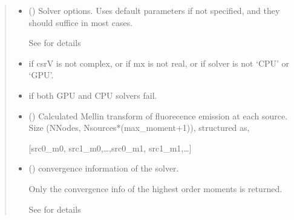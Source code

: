 \documentclass[letterpaper,10pt,english]{sphinxmanual}
\begin{document}
\begin{fulllineitems}
\begin{quote}
\begin{description}
\begin{itemize}
\item {} 
\sphinxAtStartPar
{} ({\hyperref[\detokenize{_autosummary/nirfasterff.utils.SolverOptions:nirfasterff.utils.SolverOptions}]{}}\sphinxstyleliteralemphasis{\sphinxupquote{, }}) \textendash{} 
\sphinxAtStartPar
Solver options. Uses default parameters if not specified, and they should suffice in most cases.

\sphinxAtStartPar
See {\hyperref[\detokenize{_autosummary/nirfasterff.utils.SolverOptions:nirfasterff.utils.SolverOptions}]{}} for details


\end{itemize}

\begin{itemize}
\item {} 
\sphinxAtStartPar
{} \textendash{} if csrV is not complex, or if mx is not real, or if solver is not ‘CPU’ or ‘GPU’.

\item {} 
\sphinxAtStartPar
{} \textendash{} if both GPU and CPU solvers fail.

\end{itemize}

\sphinxAtStartPar
\begin{itemize}
\item {} 
\sphinxAtStartPar
{} () \textendash{} Calculated Mellin transform of fluorecence emission at each source. Size (NNodes, Nsources*(max\_moment+1)), structured as,

\sphinxAtStartPar
{[}src0\_m0, src1\_m0,…,src0\_m1, src1\_m1,…{]}

\item {} 
\sphinxAtStartPar
{} () \textendash{} convergence information of the solver.

\sphinxAtStartPar
Only the convergence info of the highest order moments is returned.

\sphinxAtStartPar
See {\hyperref[\detokenize{_autosummary/nirfasterff.utils.ConvergenceInfo:nirfasterff.utils.ConvergenceInfo}]{}} for details


\end{itemize}
\end{description}
\end{quote}
\end{fulllineitems}
\end{document}
